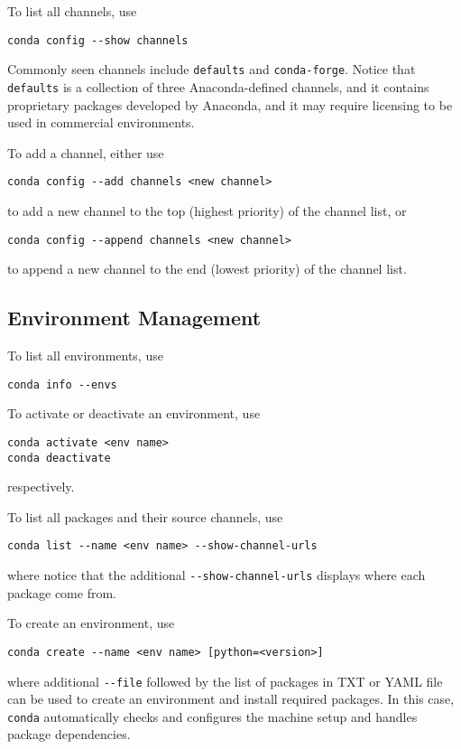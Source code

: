 To list all channels, use
\begin{lstlisting}
conda config --show channels
\end{lstlisting}

Commonly seen channels include \verb|defaults| and \verb|conda-forge|. Notice that \verb|defaults| is a collection of three Anaconda-defined channels, and it contains proprietary packages developed by Anaconda, and it may require licensing to be used in commercial environments.

To add a channel, either use
\begin{lstlisting}
conda config --add channels <new channel>
\end{lstlisting}
to add a new channel to the top (highest priority) of the channel list, or
\begin{lstlisting}
conda config --append channels <new channel>
\end{lstlisting}
to append a new channel to the end (lowest priority) of the channel list.

\subsection{Environment Management}

To list all environments, use
\begin{lstlisting}
conda info --envs
\end{lstlisting}

To activate or deactivate an environment, use
\begin{lstlisting}
conda activate <env name>
conda deactivate
\end{lstlisting}
respectively.

To list all packages and their source channels, use
\begin{lstlisting}
conda list --name <env name> --show-channel-urls
\end{lstlisting}
where notice that the additional \verb|--show-channel-urls| displays where each package come from.

To create an environment, use
\begin{lstlisting}
conda create --name <env name> [python=<version>]
\end{lstlisting}
where additional \verb|--file| followed by the list of packages in TXT or YAML file can be used to create an environment and install required packages. In this case, \verb|conda| automatically checks and configures the machine setup and handles package dependencies. 

